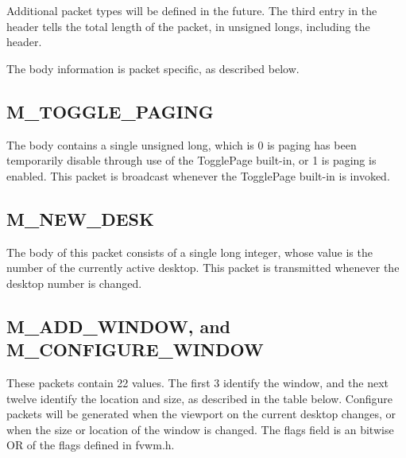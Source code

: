 Additional packet types will be defined in the future. The third entry
in the header tells the total length of the packet, in unsigned longs,
including the header.

The body information is packet specific, as described below.
\subsection{M\_TOGGLE\_PAGING}
The body contains a single unsigned long, which is 0 is paging has
been temporarily disable through use of the TogglePage built-in, or 1
is paging is enabled. This packet is broadcast whenever the TogglePage
built-in is invoked.

\subsection{M\_NEW\_DESK}
The body of this packet consists of a single long integer, whose value
is the number of the currently active desktop. This packet is
transmitted whenever the desktop number is changed.

\subsection{M\_ADD\_WINDOW, and M\_CONFIGURE\_WINDOW}
These packets contain 22 values. The first 3 identify the window, and
the next twelve identify the location and size, as described in the
table below. Configure packets will be generated when the
viewport on the current desktop changes, or when the size or location
of the window is changed. The flags field is an bitwise OR of the
flags defined in fvwm.h.



